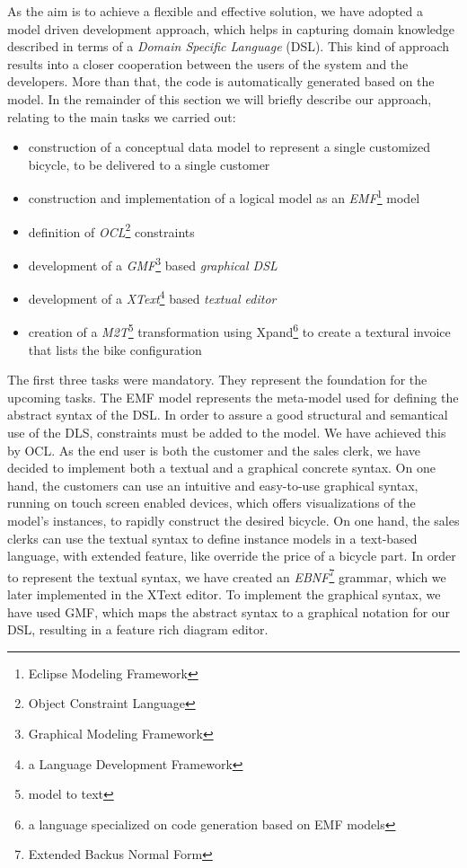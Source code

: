 \noindent As the aim is to achieve a flexible and effective solution, we have
adopted a model driven development approach, which helps in capturing domain
knowledge described in terms of a \emph{Domain Specific Language} (DSL). This
kind of approach results into a closer cooperation between the users of the
system and the developers. More than that, the code is automatically generated
based on the model. In the remainder of this section we will briefly describe
our approach, relating to the main tasks we carried out:
\begin{itemize}
  \item construction of a conceptual data model to represent a single customized
  bicycle, to be delivered to a single customer
  \item construction and implementation of a logical model as an
  \emph{EMF}\footnote{Eclipse Modeling Framework} model
  \item definition of \emph{OCL}\footnote{Object Constraint Language}
  constraints
  \item development of a \emph{GMF}\footnote{Graphical Modeling Framework} based
  \emph{graphical DSL}
  \item development of a \emph{XText}\footnote{a Language Development Framework}
  based \emph{textual editor}
  \item creation of a \emph{M2T}\footnote{model to text} transformation using
  Xpand\footnote{a language specialized on code generation based on EMF models}
  to create a textural invoice that lists the bike configuration
\end{itemize} 

\noindent The first three tasks were mandatory. They represent the foundation
for the upcoming tasks. The EMF model represents the meta-model used for
defining the abstract syntax of the DSL. In order to assure a good structural
and semantical use of the DLS, constraints must be added to the model. We have
achieved this by OCL. As the end user is both the customer and the sales clerk,
we have decided to implement both a textual and a graphical concrete syntax. On
one hand, the customers can use an intuitive and easy-to-use graphical
syntax, running on touch screen enabled devices, which offers visualizations
of the model's instances, to rapidly construct the desired bicycle. On one hand,
the sales clerks can use the textual syntax to define instance models in a text-based language, with extended feature, like
override the price of a bicycle part. In order to represent the textual syntax,
we have created an \emph{EBNF}\footnote{Extended Backus Normal
Form} grammar, which we later implemented in the XText editor. To implement the
graphical syntax, we have used GMF, which maps the abstract syntax to a
graphical notation for our DSL, resulting in a feature rich diagram editor.\\


